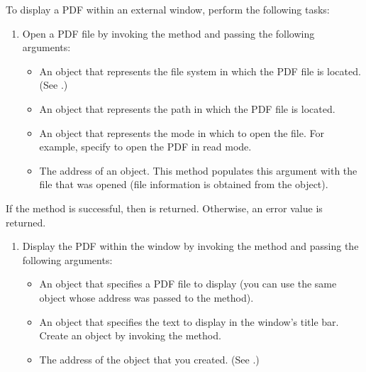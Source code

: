 \documentclass[letterpaper,12pt,english,openany,oneside]{sphinxmanual}
\begin{document}
To display a PDF within an external window, perform the following tasks:
\begin{enumerate}
%
\item {} 
Open a PDF file by invoking the  method and passing the following arguments:
\begin{itemize}
\item {} 
An  object that represents the file system in which the PDF file is located. (See .)

\item {} 
An  object that represents the path in which the PDF file is located.

\item {} 
An  object that represents the mode in which to open the file. For example, specify  to open the PDF in read mode.

\item {} 
The address of an  object. This method populates this argument with the file that was opened (file information is obtained from the  object).

\end{itemize}

\end{enumerate}

If the  method is successful, then  is returned. Otherwise, an error value is returned.
\begin{enumerate}
%
\setcounter{enumi}{1}
\item {} 
Display the PDF within the window by invoking the  method and passing the following arguments:
\begin{itemize}
\item {} 
An  object that specifies a PDF file to display (you can use the same  object whose address was passed to the  method).

\item {} 
An  object that specifies the text to display in the window’s title bar. Create an  object by invoking the  method.

\item {} 
The address of the  object that you created. (See .)

\end{itemize}

\end{enumerate}
\end{document}
